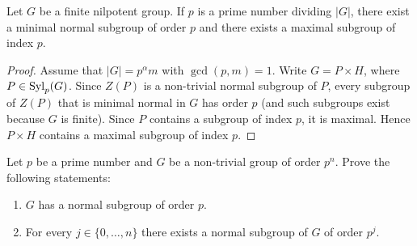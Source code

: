 

\begin{theorem}
Let $G$ be a finite nilpotent group. If $p$ is a prime number dividing 
$|G|$, there exist a minimal normal subgroup of order $p$ and 
there exists a maximal subgroup of index $p$. 
\end{theorem}

\begin{proof}
Assume that $|G|=p^{\alpha}m$ with $\gcd(p,m)=1$. 
Write $G=P\times H$, where $P\in\mathrm{Syl}_p(G)$.  Since $Z(P)$ is a non-trivial normal subgroup of
$P$, every subgroup of $Z(P)$ that is minimal normal in $G$ has order $p$ (and such subgroups exist because $G$ is finite). Since $P$ contains a subgroup of index $p$, 
it is maximal. Hence $P\times H$ contains 
a maximal subgroup of index $p$.
\end{proof}

\begin{exercise}
\label{xca:pgrupos}
Let $p$ be a prime number and $G$ be a non-trivial group 
of order $p^n$.
Prove the following statements:
\begin{enumerate}
	\item $G$ has a normal subgroup of order $p$.
	\item For every $j\in\{0,\dots,n\}$ there exists a normal subgroup 
            of $G$ of order $p^j$. 
\end{enumerate}
\end{exercise}

